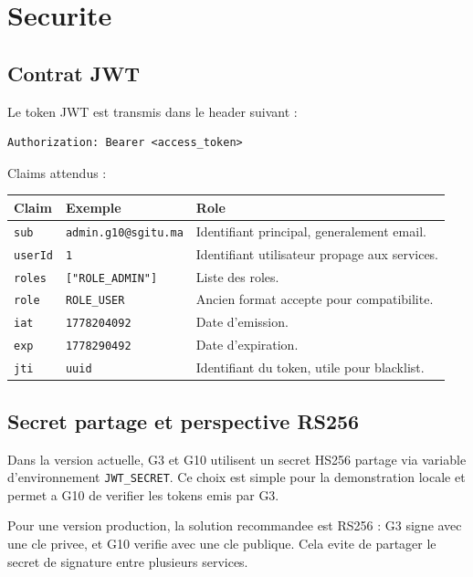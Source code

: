 \documentclass[12pt,a4paper]{article}
\begin{document}
\newpage

\section{Securite}

\subsection{Contrat JWT}

Le token JWT est transmis dans le header suivant :

\begin{lstlisting}[style=code]
Authorization: Bearer <access_token>
\end{lstlisting}

Claims attendus :

\begin{longtable}{p{3cm}p{4cm}p{7cm}}
\toprule
\textbf{Claim} & \textbf{Exemple} & \textbf{Role} \\
\midrule
\texttt{sub} & \texttt{admin.g10@sgitu.ma} & Identifiant principal, generalement email. \\
\texttt{userId} & \texttt{1} & Identifiant utilisateur propage aux services. \\
\texttt{roles} & \texttt{["ROLE\_ADMIN"]} & Liste des roles. \\
\texttt{role} & \texttt{ROLE\_USER} & Ancien format accepte pour compatibilite. \\
\texttt{iat} & \texttt{1778204092} & Date d'emission. \\
\texttt{exp} & \texttt{1778290492} & Date d'expiration. \\
\texttt{jti} & \texttt{uuid} & Identifiant du token, utile pour blacklist. \\
\bottomrule
\end{longtable}

\subsection{Secret partage et perspective RS256}

Dans la version actuelle, G3 et G10 utilisent un secret HS256 partage via variable d'environnement \texttt{JWT\_SECRET}. Ce choix est simple pour la demonstration locale et permet a G10 de verifier les tokens emis par G3.

\begin{warningBox}
Pour une version production, la solution recommandee est RS256 : G3 signe avec une cle privee, et G10 verifie avec une cle publique. Cela evite de partager le secret de signature entre plusieurs services.
\end{warningBox}
\end{document}
